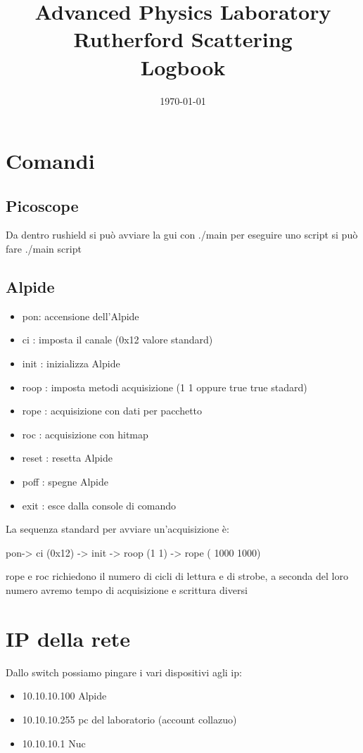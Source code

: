 \documentclass[a4paper]{article}
\title{\textbf{\huge Advanced Physics Laboratory}\\\textbf{\huge Rutherford Scattering}\\Logbook}
\date{\today}
\begin{document}
\maketitle
\vspace{1cm}


\section{Comandi}
\subsection{Picoscope}
Da dentro rushield si può avviare la gui con ./main per eseguire uno script si può fare ./main script



\subsection{Alpide}

\begin{itemize}
	\item pon: accensione dell'Alpide
	\item ci : imposta il canale (0x12 valore standard)
	\item init : inizializza Alpide
	\item roop : imposta metodi acquisizione (1 1 oppure true true stadard)
	\item rope : acquisizione con dati per pacchetto
	\item roc : acquisizione con hitmap
	\item reset : resetta Alpide
	\item poff : spegne Alpide
	\item exit : esce dalla console di comando
\end{itemize}

La sequenza standard per avviare un'acquisizione è:

pon-> ci (0x12) -> init -> roop (1 1) -> rope ( 1000 1000)

rope e roc richiedono il numero di cicli di lettura e di strobe, a seconda del loro numero avremo tempo di acquisizione e scrittura diversi

\section{IP della rete}

Dallo switch possiamo pingare i vari dispositivi agli ip:
\begin{itemize}
	\item 10.10.10.100 Alpide
	\item 10.10.10.255 pc del laboratorio (account collazuo)
	\item 10.10.10.1  Nuc
\end{itemize}
\end{document}
